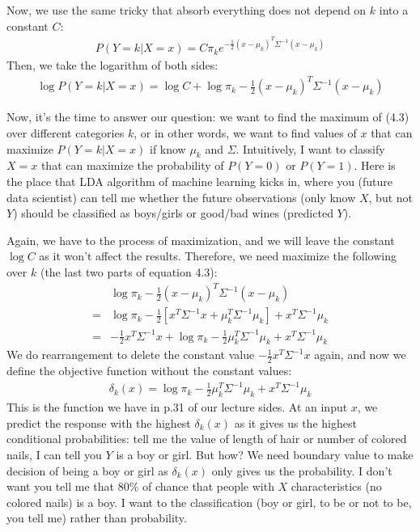 \documentclass[12pt]{article}
\theoremstyle{definition}
\numberwithin{equation}{section}
\numberwithin{figure}{section}
\numberwithin{table}{section}
\begin{document}
Now, we use the same tricky that absorb everything does not depend on $k$ into a constant $C$:
\begin{align*}
	P(Y=k |X = x) = C \pi_k e^{-\frac{1}{2} (x - \mu_k)^T \Sigma^{-1}(x - \mu_k) }
\end{align*}
Then, we take the logarithm of both sides:
\begin{align}
	\log P(Y=k |X = x) = \log C + \log \pi_k -\frac{1}{2} (x - \mu_k)^T \Sigma^{-1}(x - \mu_k)
\end{align}

Now, it's the time to answer our question: we want to find the maximum of (4.3) over different categories $k$, or in other words, we want to find values of $x$ that can maximize $P(Y=k|X =x)$ if know $\mu_k$ and $\Sigma$. Intuitively, I want to classify $X=x$ that can maximize the probability of $P(Y=0)$ or $P(Y=1)$. Here is the place that LDA algorithm of machine learning kicks in, where you (future data scientist) can tell me whether the future observations (only know $X$, but not $Y$) should be classified as boys/girls or good/bad wines (predicted $Y$). 

Again, we have to the process of maximization, and we will leave the constant $\log C$ as it won't affect the results. Therefore, we need maximize the following over $k$ (the last two parts of equation 4.3): 
\begin{align*}
	 & \log \pi_k -\frac{1}{2} (x - \mu_k)^T \Sigma^{-1}(x - \mu_k) \\
	= &  \log \pi_k - \frac{1}{2}[ x^T \Sigma^{-1} x + \mu_k^T \Sigma^{-1} \mu_k] + x^T \Sigma^{-1} \mu_k \tag{do expansion} \\
	= & - \frac{1}{2}  x^T \Sigma^{-1} x + \log \pi_k - \frac{1}{2} \mu_k^T \Sigma^{-1} \mu_k + x^T \Sigma^{-1} \mu_k \tag{rearrange}
\end{align*}
We do rearrangement to delete the constant value $- \frac{1}{2}  x^T \Sigma^{-1} x $ again, and now we define the objective function without the constant values:
\begin{align}
 \delta_k(x) = 	\log \pi_k - \frac{1}{2} \mu_k^T \Sigma^{-1} \mu_k + x^T \Sigma^{-1} \mu_k 
\end{align}
This is the function we have in p.31 of our lecture sides. At an input $x$, we predict the response with the highest $\delta_k(x)$ as it gives us the highest conditional probabilities: tell me the value of length of hair or number of colored nails, I can tell you $Y$ is a boy or girl. But how? We need boundary value to make decision of being a boy or girl as $\delta_k(x)$ only gives us the probability. I don't want you tell me that 80\% of chance that people with $X$ characteristics (no colored nails) is a boy. I want to the classification (boy or girl, to be or not to be, you tell me) rather than probability. 
\end{document}
